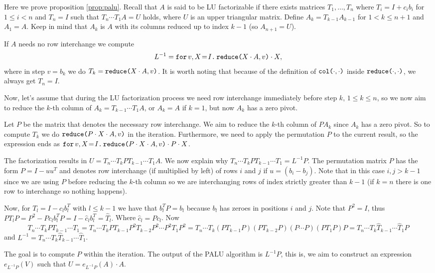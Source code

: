 Here we prove proposition \ref{prop:palu}. Recall that $A$ is said to be LU factorizable if there exists matrices $T_1,\ldots, T_{n}$ where $T_i=I+c_ib_i$ for $1\leq i < n$ and $T_n=I$ such that $T_{n}\cdots T_1A=U$ holds, where $U$ is an upper triangular matrix. Define $A_k=T_{k-1}A_{k-1}$ for $1< k\leq n+1$ and $A_1=A$. Keep in mind that $A_k$ is $A$ with its columns reduced up to index $k-1$ (so $A_{n+1}=U$). 

If $A$ needs no row interchange we compute $$L^{-1}=\initf{I}{v}{X}{\red{X\cdot A}{v}\cdot X},$$ where in step $v=b_k$ we do $T_k=\red{X\cdot A}{v}$. It is worth noting that because of the definition of $\ccol{\cdot}{\cdot}$ inside $\red{\cdot}{\cdot}$, we always get $T_n=I$.


Now, let's assume that during the LU factorization process we need row interchange immediately before step $k$, $1\leq k\leq n$, so we now aim to reduce the $k$-th column of $A_k=T_{k-1}\cdots T_1A$, or $A_k=A$ if $k=1$, but now $A_k$ has a zero pivot. 

Let $P$ be the matrix that denotes the necessary row interchange. We aim to reduce the $k$-th column of $PA_{k}$ since $A_{k}$ has a zero pivot. So to compute $T_k$ we do $\red{P\cdot X\cdot A}{v}$ in the iteration. Furthermore, we need to apply the permutation $P$ to the current result, so the expression ends as $\initf{I}{v}{X}{\red{P\cdot X\cdot A}{v}\cdot P\cdot X}$.

The factorization results in $U=T_{n}\cdots T_kPT_{k-1}\cdots T_1A$. We now explain why $T_{n}\cdots T_kPT_{k-1}\cdots T_1 = L^{-1}P.$ The permutation matrix $P$ has the form $P = I - uu^T$ and denotes row interchange (if multiplied by left) of rows $i$ and $j$ if $u=(b_{i}-b_{j})$. Note that in this case $i,j>k-1$ since we are using $P$ before reducing the $k$-th column so we are interchanging rows of index strictly greater than $k-1$ (if $k=n$ there is one row to interchange so nothing happens).

Now, for $T_{l}=I-c_lb_l^T$ with $l\leq k-1$ we have that $b_l^TP=b_l$ because $b_l$ has zeroes in positions $i$ and $j$. Note that $P^2=I$, thus $PT_lP=P^2-Pc_lb_l^TP=I-\widehat{c}_lb_l^T=\widehat{T}_l.$ Where $\widehat{c}_l=Pc_l$. Now $$T_{n}\cdots T_kPT_{k-1}\cdots T_1=T_{n}\cdots T_kPT_{k-1}P^2T_{k-2}P^2\cdots P^2 T_1P^2=T_{n}\cdots T_k(PT_{k-1}P)(PT_{k-2}P)(P\cdots P)(PT_1P)P=T_{n}\cdots T_k\widehat{T}_{k-1}\cdots \widehat{T}_1P$$ and $L^{-1} = T_{n}\cdots T_k\widehat{T}_{k-1}\cdots \widehat{T}_1$.

The goal is to compute $P$ within the iteration. The output of the PALU algorithm is $L^{-1}P$, this is, we aim to construct an expression $e_{L^{-1}P}(V)$ such that $U=e_{L^{-1}P}(A)\cdot A$.

